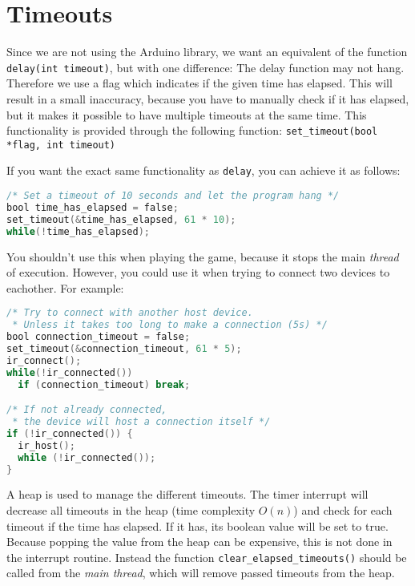 \section{Timeouts}

Since we are not using the Arduino library, we want an equivalent of the
function \texttt{delay(int timeout)}, but with one difference: The delay
function may not hang. Therefore we use a flag which indicates if the given
time has elapsed. This will result in a small inaccuracy, because you have to
manually check if it has elapsed, but it makes it possible to have multiple
timeouts at the same time. This functionality is provided through the following
function: \texttt{set\_timeout(bool *flag, int timeout)}

If you want the exact same functionality as \texttt{delay}, you can achieve it
as follows:

\begin{lstlisting}[language=C,frame=single,captionpos=b,caption={A typical
delay function}]
/* Set a timeout of 10 seconds and let the program hang */
bool time_has_elapsed = false;
set_timeout(&time_has_elapsed, 61 * 10);
while(!time_has_elapsed);
\end{lstlisting}

You shouldn't use this when playing the game, because it stops the main
\emph{thread} of execution. However, you could use it when trying to connect
two devices to eachother. For example:

\begin{lstlisting}[language=C,frame=single,captionpos=b,caption={A typical
timeout function}]
/* Try to connect with another host device.
 * Unless it takes too long to make a connection (5s) */
bool connection_timeout = false;
set_timeout(&connection_timeout, 61 * 5);
ir_connect();
while(!ir_connected())
  if (connection_timeout) break;

/* If not already connected,
 * the device will host a connection itself */
if (!ir_connected()) {
  ir_host();
  while (!ir_connected());
}
\end{lstlisting}


A heap is used to manage the different timeouts. The timer interrupt will
decrease all timeouts in the heap (time complexity $O(n)$) and check for each
timeout if the time has elapsed. If it has, its boolean value will be set to
true. Because popping the value from the heap can be expensive, this is not
done in the interrupt routine. Instead the function
\texttt{clear\_elapsed\_timeouts()} should be called from the \emph{main
  thread}, which will remove passed timeouts from the heap.

